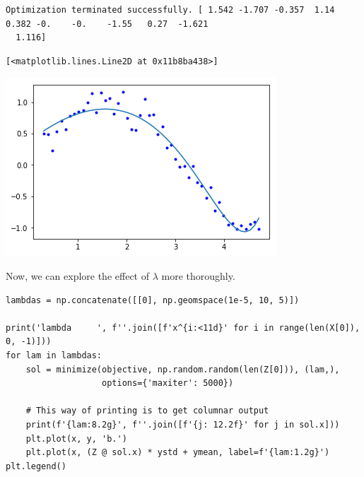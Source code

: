 \documentclass[11pt]{article}
\begin{document}
\begin{verbatim}
Optimization terminated successfully. [ 1.542 -1.707 -0.357  1.14   0.382 -0.    -0.    -1.55   0.27  -1.621
  1.116]

\end{verbatim}

\begin{verbatim}
[<matplotlib.lines.Line2D at 0x11b8ba438>]
\end{verbatim}



\begin{center}
\includegraphics[width=.9\linewidth]{obipy-resources/d00b1703e45a1bb2f86b06f32bba01b8-19673e1e.png}
\end{center}

Now, we can explore the effect of \(\lambda\) more thoroughly.

\begin{verbatim}
lambdas = np.concatenate([[0], np.geomspace(1e-5, 10, 5)])

print('lambda     ', f''.join([f'x^{i:<11d}' for i in range(len(X[0]), 0, -1)]))
for lam in lambdas:
    sol = minimize(objective, np.random.random(len(Z[0])), (lam,),
                   options={'maxiter': 5000})

    # This way of printing is to get columnar output
    print(f'{lam:8.2g}', f''.join([f'{j: 12.2f}' for j in sol.x]))
    plt.plot(x, y, 'b.')
    plt.plot(x, (Z @ sol.x) * ystd + ymean, label=f'{lam:1.2g}')
plt.legend()
\end{verbatim}
\end{document}
